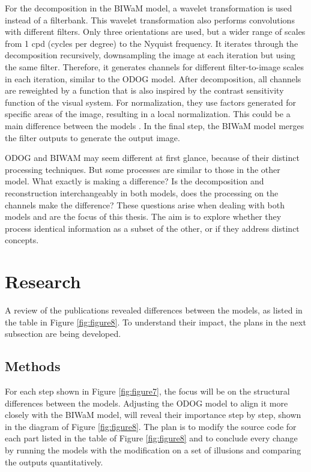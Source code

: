 For the decomposition in the BIWaM model, a wavelet transformation is used instead of a
filterbank. This wavelet transformation also performs convolutions with different filters.
Only three orientations are used, but a wider range of scales from 1 cpd (cycles per
degree) to the Nyquist frequency. It iterates through the decomposition recursively,
downsampling the image at each iteration but using the same filter. Therefore, it
generates channels for different filter-to-image scales in each iteration, similar to the
ODOG model. After decomposition, all channels are reweighted by a function that is also
inspired by the contrast sensitivity function of the visual system. For normalization,
they use factors generated for specific areas of the image, resulting in a local
normalization. This could be a main difference between the models \parencite{Betz2015}. In
the final step, the BIWaM model merges the filter outputs to generate the output image.


ODOG and BIWAM may seem different at first glance, because of their distinct processing
techniques. But some processes are similar to those in the other model. What exactly is
making a difference? Is the decomposition and reconstruction interchangeably in both
models, does the processing on the channels make the difference? These questions arise
when dealing with both models and are the focus of this thesis.  The aim is to explore
whether they process identical information as a subset of the other, or if they address
distinct concepts.

\newpage


\section{Research}

A review of the publications revealed differences between the models, as listed in the
table in Figure \ref{fig:figure8}. To understand their impact, the plans in the next
subsection are being developed.

\subsection{Methods}

For each step shown in Figure \ref{fig:figure7}, the focus will be on the structural
differences between the models. Adjusting the ODOG model to align it more closely with the
BIWaM model, will reveal their importance step by step, shown in the diagram of Figure
\ref{fig:figure8}. The plan is to modify the source code for each part listed in the table
of Figure \ref*{fig:figure8} and to conclude every change by running the models with the
modification on a set of illusions and comparing the outputs quantitatively.

